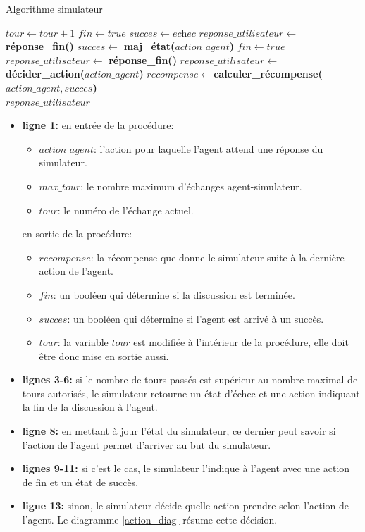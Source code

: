 \begin{algorithm}[H]
	\caption{Algorithme simulateur}\label{euclid}
	\begin{algorithmic}[1]
		\State $tour \gets tour+1$
		\State $fin \gets \textit{true}$
		\State $succes \gets \textit{echec}$
		\State $reponse\_utilisateur \gets $ \textbf{réponse\_fin()}
		\Else
		\State $succes \gets$ \textbf{maj\_état(}$action\_agent$\textbf{)}
		\State $fin \gets \textit{true}$
		\State $reponse\_utilisateur \gets $ \textbf{réponse\_fin()}
		\Else 
		\State $reponse\_utilisateur \gets $ \textbf{décider\_action(}$action\_agent$\textbf{)}
		\EndIf
		\EndIf
		\State $recompense \gets $\textbf{calculer\_récompense(}$action\_agent, succes$\textbf{)}\\
		\Return $reponse\_utilisateur$
		\EndProcedure
		
	\end{algorithmic}
\end{algorithm}
\begin{itemize}
	\item \textbf{ligne 1:} en entrée de la procédure:
	\begin{itemize}
		\item $action\_agent$: l'action pour laquelle l'agent attend une réponse du simulateur.
		\item $max\_tour$: le nombre maximum d'échanges agent-simulateur.
		\item $tour$: le numéro de l'échange actuel.
	\end{itemize}
	en sortie de la procédure:
	\begin{itemize}
		\item $recompense$: la récompense que donne le simulateur suite à la dernière action de l'agent.
		\item $fin$: un booléen qui détermine si la discussion est terminée.
		\item $succes$: un booléen qui détermine si l'agent est arrivé à un succès.
		\item $tour$: la variable $tour$ est modifiée à l'intérieur de la procédure, elle doit être donc mise en sortie aussi.
	\end{itemize}
	\item \textbf{lignes 3-6:} si le nombre de tours passés est supérieur au nombre maximal de tours autorisés, le simulateur retourne un état d'échec et une action indiquant la fin de la discussion à l'agent.
	\item \textbf{ligne 8:} en mettant à jour l'état du simulateur, ce dernier peut savoir si l'action de l'agent permet d'arriver au but du simulateur.
	\item \textbf{lignes 9-11:} si c'est le cas, le simulateur l'indique à l'agent avec une action de fin et un état de succès.
	\item \textbf{ligne 13:} sinon, le simulateur décide quelle action prendre selon l'action de l'agent. Le diagramme \ref{action_diag} résume cette décision.
\end{itemize}

